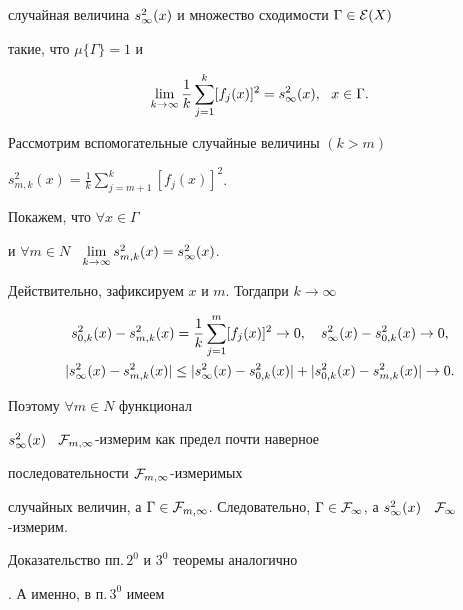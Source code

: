 случайная величина $s^2_\infty(x)$ и множество сходимости $\Gamma\in{\cal E}(X)$


такие, что $\mu \{\Gamma\}=1$ и


\begin{equation*}


\lim_{k\to\infty}\frac1k\sum_{j=1}^k[f_j(x)]^2=\stwo,\ \ x\in\Gamma.




\end{equation*}


Рассмотрим вспомогательные случайные величины $(k>m)$


$s^2_{m,k}(x)=\frac1k\sum\limits_{j=m+1}^k[f_j(x)]^2$.


Покажем, что $\forall x\in\Gamma$


и $\forall m\in N$ \ $\lim\limits_{k\to\infty} s^2_{m,k}(x)=s^2_\infty(x)$.


Действительно, зафиксируем $x$ и $m$. Тогда\linebreak при $k\to\infty$


\begin{gather*}


s^2_{0,k}(x)-s^2_{m,k}(x)=\frac1k\sum_{j=1}^m[f_j(x)]^2\to 0, \quad


\stwo-s^2_{0,k}(x)\to 0,\\


%


|\stwo-s^2_{m,k}(x)|\le|\stwo-s^2_{0,k}(x)|+


|s^2_{0,k}(x)-s^2_{m,k}(x)|\to 0.


\end{gather*}


Поэтому $\forall m\in N$ функционал


$s^2_\infty(x)$ \ ${\cal F}_{m,\infty}$-измерим как предел почти наверное 


последовательности ${\cal F}_{m,\infty}$-измеримых


случайных величин, а $\Gamma\in{\cal F}_{m,\infty}$. Следовательно, $\Gamma


\in{\cal F}_\infty$, а $\stwo$ \ ${\cal F}_\infty$-измерим.





Доказательство пп.\,$2^0$ и $3^0$ теоремы аналогично


\cite{Shats}. А именно, в п.\,$3^0$ имеем


